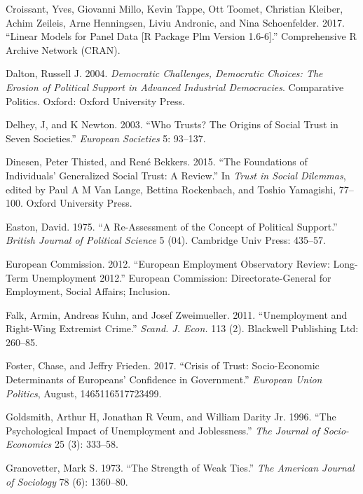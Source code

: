 \documentclass[12pt,]{article}
\begin{document}
\leavevmode\hypertarget{ref-Croissant2017-mt}{}%
Croissant, Yves, Giovanni Millo, Kevin Tappe, Ott Toomet, Christian Kleiber, Achim Zeileis, Arne Henningsen, Liviu Andronic, and Nina Schoenfelder. 2017. ``Linear Models for Panel Data {[}R Package Plm Version 1.6-6{]}.'' Comprehensive R Archive Network (CRAN).

\leavevmode\hypertarget{ref-Dalton2004-ba}{}%
Dalton, Russell J. 2004. \emph{Democratic Challenges, Democratic Choices: The Erosion of Political Support in Advanced Industrial Democracies}. Comparative Politics. Oxford: Oxford University Press.

\leavevmode\hypertarget{ref-Delhey2003-hv}{}%
Delhey, J, and K Newton. 2003. ``Who Trusts? The Origins of Social Trust in Seven Societies.'' \emph{European Societies} 5: 93--137.

\leavevmode\hypertarget{ref-Dinesen2015-fr}{}%
Dinesen, Peter Thisted, and René Bekkers. 2015. ``The Foundations of Individuals' Generalized Social Trust: A Review.'' In \emph{Trust in Social Dilemmas}, edited by Paul A M Van Lange, Bettina Rockenbach, and Toshio Yamagishi, 77--100. Oxford University Press.

\leavevmode\hypertarget{ref-Easton1975-pe}{}%
Easton, David. 1975. ``A Re-Assessment of the Concept of Political Support.'' \emph{British Journal of Political Science} 5 (04). Cambridge Univ Press: 435--57.

\leavevmode\hypertarget{ref-European_Commission2012-pk}{}%
European Commission. 2012. ``European Employment Observatory Review: Long-Term Unemployment 2012.'' European Commission: Directorate-General for Employment, Social Affairs; Inclusion.

\leavevmode\hypertarget{ref-Falk2011-ni}{}%
Falk, Armin, Andreas Kuhn, and Josef Zweimueller. 2011. ``Unemployment and Right-Wing Extremist Crime.'' \emph{Scand. J. Econ.} 113 (2). Blackwell Publishing Ltd: 260--85.

\leavevmode\hypertarget{ref-Foster2017-si}{}%
Foster, Chase, and Jeffry Frieden. 2017. ``Crisis of Trust: Socio-Economic Determinants of Europeans' Confidence in Government.'' \emph{European Union Politics}, August, 1465116517723499.

\leavevmode\hypertarget{ref-Goldsmith1996-ks}{}%
Goldsmith, Arthur H, Jonathan R Veum, and William Darity Jr. 1996. ``The Psychological Impact of Unemployment and Joblessness.'' \emph{The Journal of Socio-Economics} 25 (3): 333--58.

\leavevmode\hypertarget{ref-Granovetter1973-vq}{}%
Granovetter, Mark S. 1973. ``The Strength of Weak Ties.'' \emph{The American Journal of Sociology} 78 (6): 1360--80.
\end{document}
